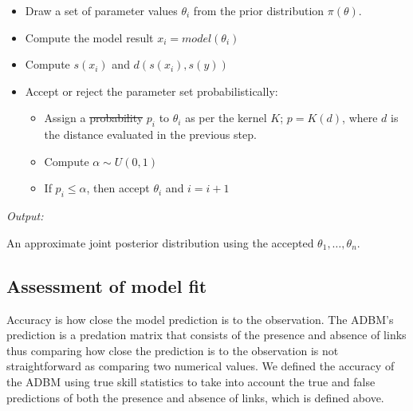 \documentclass{article}
\providecommand{\DIFaddtex}[1]{{\protect\color{blue}\uwave{#1}}} %
\providecommand{\DIFdeltex}[1]{{\protect\color{red}\sout{#1}}}                      %
\providecommand{\DIFaddbegin}{} %
\providecommand{\DIFaddend}{} %
\providecommand{\DIFdelbegin}{} %
\providecommand{\DIFdelend}{} %
\providecommand{\DIFadd}[1]{\texorpdfstring{\DIFaddtex{#1}}{#1}} %
\providecommand{\DIFdel}[1]{\texorpdfstring{\DIFdeltex{#1}}{}} %
\newcommand{\DIFscaledelfig}{0.5}
\newlength{\DIFdelgraphicswidth} %
\newlength{\DIFdelgraphicsheight} %
\newcommand{\DIFaddincludegraphics}[2][]{{\color{blue}\fbox{\DIFOincludegraphics[#1]{#2}}}} %
\newcommand{\DIFdelincludegraphics}[2][]{%
\sbox{\DIFdelgraphicsbox}{\DIFOincludegraphics[#1]{#2}}%
\settoboxwidth{\DIFdelgraphicswidth}{\DIFdelgraphicsbox} %
\settoboxtotalheight{\DIFdelgraphicsheight}{\DIFdelgraphicsbox} %
\scalebox{\DIFscaledelfig}{%
\parbox[b]{\DIFdelgraphicswidth}{\usebox{\DIFdelgraphicsbox}\\[-\baselineskip] \rule{\DIFdelgraphicswidth}{0em}}\llap{\resizebox{\DIFdelgraphicswidth}{\DIFdelgraphicsheight}{%
\setlength{\unitlength}{\DIFdelgraphicswidth}%
\begin{picture}(1,1)%
\thicklines\linethickness{2pt} %
{\color[rgb]{1,0,0}\put(0,0){\framebox(1,1){}}}%
{\color[rgb]{1,0,0}\put(0,0){\line( 1,1){1}}}%
{\color[rgb]{1,0,0}\put(0,1){\line(1,-1){1}}}%
\end{picture}%
}\hspace*{3pt}}} %
} %
\DeclareRobustCommand{\DIFaddbegin}{\DIFOaddbegin \let\includegraphics\DIFaddincludegraphics} %
\DeclareRobustCommand{\DIFaddend}{\DIFOaddend \let\includegraphics\DIFOincludegraphics} %
\DeclareRobustCommand{\DIFdelbegin}{\DIFOdelbegin \let\includegraphics\DIFdelincludegraphics} %
\DeclareRobustCommand{\DIFdelend}{\DIFOaddend \let\includegraphics\DIFOincludegraphics} %
\begin{document}
\begin{itemize}
\item
  Draw a set of parameter values \(\theta_i\) from the prior
  distribution \(\pi(\theta)\).
\item
  Compute the model result \(x_i = model(\theta_i)\)
\item
  Compute \(s(x_i)\) and \(d(s(x_i), s(y))\)
\item
  Accept or reject the parameter set probabilistically:

  \begin{itemize}
  \item
    Assign a \DIFdelbegin \DIFdel{probability }\DIFdelend \DIFaddbegin \DIFadd{weight }\DIFaddend \(p_i\) to \(\theta_i\) as per the kernel \(K\);
    \DIFdelbegin \DIFdel{\(p = K(d)\)}\DIFdelend \DIFaddbegin \DIFadd{\(p_i = \frac{K(d)}{K(0)}\)}\DIFaddend , where \(d\) is the distance evaluated
    in the previous step.
  \item
    Compute \(\alpha \sim U(0,1)\)
  \item
    If \DIFdelbegin \DIFdel{\(p_i \leq \alpha\)}\DIFdelend \DIFaddbegin \DIFadd{\(\alpha \leq p_i\)}\DIFaddend , then accept \(\theta_i\) and \(i = i + 1\)
  \end{itemize}
\end{itemize}

\emph{Output:}

An approximate joint posterior distribution using the accepted
\(\theta_1, \dots, \theta_n\).

\hypertarget{assessment-of-model-fit}{%
\subsection{Assessment of model fit}\label{assessment-of-model-fit}}

Accuracy is how close the model prediction is to the observation. The
ADBM's prediction is a predation matrix that consists of the presence
and absence of links thus comparing how close the prediction is to the
observation is not straightforward as comparing two numerical values. We
defined the accuracy of the ADBM using true skill statistics to take
into account the true and false predictions of both the presence and
absence of links, which is defined above.
\end{document}
